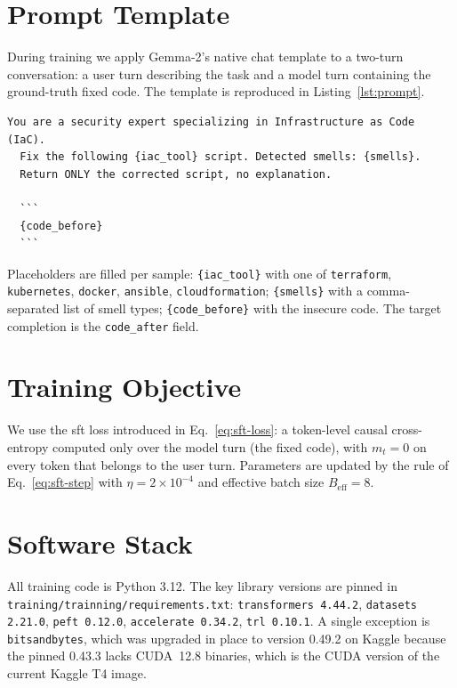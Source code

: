 \documentclass[12pt, a4paper]{report}
\begin{document}
\section{Prompt Template}

During training we apply Gemma-2's native chat template to a two-turn
conversation: a user turn describing the task and a model turn containing
the ground-truth fixed code. The template is reproduced in
Listing~\ref{lst:prompt}.

\begin{lstlisting}[caption={Instruction template applied to every training sample.},label={lst:prompt}]
  You are a security expert specializing in Infrastructure as Code (IaC).
  Fix the following {iac_tool} script. Detected smells: {smells}.
  Return ONLY the corrected script, no explanation.

  ```
  {code_before}
  ```
\end{lstlisting}

Placeholders are filled per sample: \texttt{\{iac\_tool\}} with one of
\texttt{terraform}, \texttt{kubernetes}, \texttt{docker}, \texttt{ansible},
\texttt{cloudformation}; \texttt{\{smells\}} with a comma-separated list
of smell types; \texttt{\{code\_before\}} with the insecure code.
The target completion is the \texttt{code\_after} field.

\section{Training Objective}

We use the \gls{sft} loss introduced in Eq.~\eqref{eq:sft-loss}: a
token-level causal cross-entropy computed only over the model turn (the
fixed code), with \(m_{t} = 0\) on every token that belongs to the user
turn. Parameters are updated by the rule of Eq.~\eqref{eq:sft-step} with
\(\eta = 2 \times 10^{-4}\) and effective batch size
\(B_{\mathrm{eff}} = 8\).

\section{Software Stack}

All training code is Python 3.12. The key library versions are
pinned in \texttt{training/trainning/requirements.txt}:
\texttt{transformers 4.44.2}, \texttt{datasets 2.21.0},
\texttt{peft 0.12.0}, \texttt{accelerate 0.34.2}, \texttt{trl 0.10.1}.
A single exception is \texttt{bitsandbytes}, which was upgraded in place
to version 0.49.2 on Kaggle because the pinned 0.43.3 lacks CUDA~12.8
binaries, which is the CUDA version of the current Kaggle T4 image.
\end{document}
